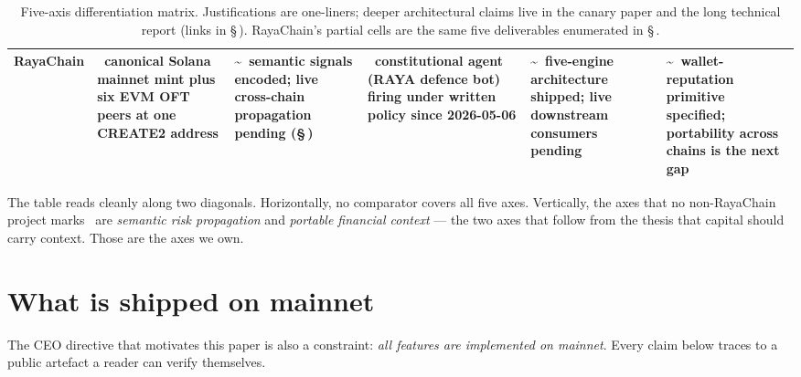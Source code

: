 \documentclass[11pt,a4paper]{article}
\newcommand{\yes}{\textcolor{green!55!black}{\textbf{\checkmark}}}
\newcommand{\partialmark}{\textcolor{orange!85!black}{\textbf{\textasciitilde}}}
\begin{document}
\begin{table}[ht]
\begin{tabularx}{\textwidth}{@{}l Y Y Y Y Y@{}}
\midrule
\textbf{RayaChain}
 & \yes\ canonical Solana mainnet mint plus six EVM OFT peers at one CREATE2 address
 & \partialmark\ semantic signals encoded; live cross-chain propagation pending (\S\,)
 & \yes\ constitutional agent (RAYA defence bot) firing under written policy since 2026-05-06
 & \partialmark\ five-engine architecture shipped; live downstream consumers pending
 & \partialmark\ wallet-reputation primitive specified; portability across chains is the next gap \\
\bottomrule
\end{tabularx}
\caption{Five-axis differentiation matrix. Justifications are
one-liners; deeper architectural claims live in the canary paper and
the long technical report (links in \S\,).
RayaChain's partial cells are the same five deliverables enumerated in
\S\,.}
\label{tab:matrix}
\end{table}

The table reads cleanly along two diagonals. Horizontally, no
comparator covers all five axes. Vertically, the axes that no
non-RayaChain project marks \yes\ are \emph{semantic risk propagation}
and \emph{portable financial context} --- the two axes that follow
from the thesis that capital should carry context. Those are the axes
we own.

\section*{What is shipped on mainnet}
\label{sec:mainnet}

The CEO directive that motivates this paper is also a constraint:
\emph{all features are implemented on mainnet}. Every claim below
traces to a public artefact a reader can verify themselves.
\end{document}
